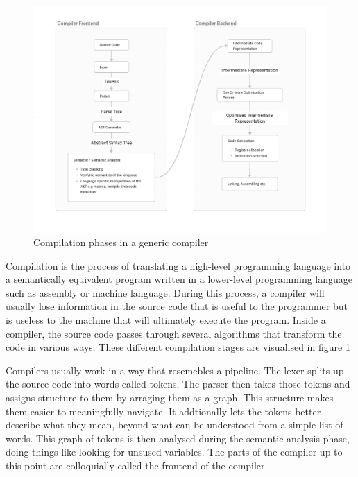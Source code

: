 \begin{figure}[t]
\includegraphics[width=\linewidth]{images/generic_compiler.png}
\centering
\caption{Compilation phases in a generic compiler}
\label{fig:compiler}
\end{figure}

Compilation is the process of translating a high-level programming language into
a semantically equivalent program written in a lower-level programming language
such as assembly or machine language. During this process, a compiler will
usually lose information in the source code that is useful to the programmer
but is useless to the machine that will ultimately execute the program. Inside
a compiler, the source code passes through several algorithms that transform
the code in various ways. These different compilation stages are visualised in
figure \ref{fig:compiler}

Compilers usually work in a way that resemebles a pipeline. The lexer splits up
the source code into words called tokens. The parser then takes those tokens and
assigns structure to them by arraging them as a graph. This structure makes them
easier to meaningfully navigate. It addtionally lets the tokens better describe
what they mean, beyond what can be understood from a simple list of words.
This graph of tokens is then analysed during the semantic analysis phase, doing
things like looking for unsused variables. The parts of the compiler up to this
point are colloquially called the frontend of the compiler.

